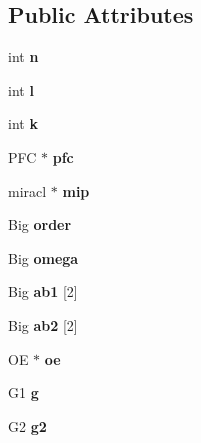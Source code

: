\subsection*{Public Attributes}
\begin{DoxyCompactItemize}
\item 
int {\bfseries n}\hypertarget{classAOE_ad58be8b79a382b9ff24ae3e7c784c568}{}\label{classAOE_ad58be8b79a382b9ff24ae3e7c784c568}

\item 
int {\bfseries l}\hypertarget{classAOE_ac3d9eb7e853fe95c1ddc489ef7d21915}{}\label{classAOE_ac3d9eb7e853fe95c1ddc489ef7d21915}

\item 
int {\bfseries k}\hypertarget{classAOE_ac1da0894513c47f77a7096bf0f982e05}{}\label{classAOE_ac1da0894513c47f77a7096bf0f982e05}

\item 
P\+FC $\ast$ {\bfseries pfc}\hypertarget{classAOE_aa6b38b90c0de109ac06699808284b643}{}\label{classAOE_aa6b38b90c0de109ac06699808284b643}

\item 
miracl $\ast$ {\bfseries mip}\hypertarget{classAOE_a65159f980bccc5b21da05c154cb8c3d0}{}\label{classAOE_a65159f980bccc5b21da05c154cb8c3d0}

\item 
Big {\bfseries order}\hypertarget{classAOE_abb473de4ed8d8294e5bb5bc4d26ade92}{}\label{classAOE_abb473de4ed8d8294e5bb5bc4d26ade92}

\item 
Big {\bfseries omega}\hypertarget{classAOE_a5bcf01ddc1f7a6962c391d60bed61975}{}\label{classAOE_a5bcf01ddc1f7a6962c391d60bed61975}

\item 
Big {\bfseries ab1} \mbox{[}2\mbox{]}\hypertarget{classAOE_ab7aba1ddc9db5600ba8c6865abce6701}{}\label{classAOE_ab7aba1ddc9db5600ba8c6865abce6701}

\item 
Big {\bfseries ab2} \mbox{[}2\mbox{]}\hypertarget{classAOE_a01feefdc255058f8437cf337dbe1e887}{}\label{classAOE_a01feefdc255058f8437cf337dbe1e887}

\item 
OE $\ast$ {\bfseries oe}\hypertarget{classAOE_a428ebbb7d1a17a6cef428103345f2b36}{}\label{classAOE_a428ebbb7d1a17a6cef428103345f2b36}

\item 
G1 {\bfseries g}\hypertarget{classAOE_a47a57d1c8f9a511317433527a49b1af5}{}\label{classAOE_a47a57d1c8f9a511317433527a49b1af5}

\item 
G2 {\bfseries g2}\hypertarget{classAOE_aefc9e7587dca527afbfac4c322b1c996}{}\label{classAOE_aefc9e7587dca527afbfac4c322b1c996}

\end{DoxyCompactItemize}


